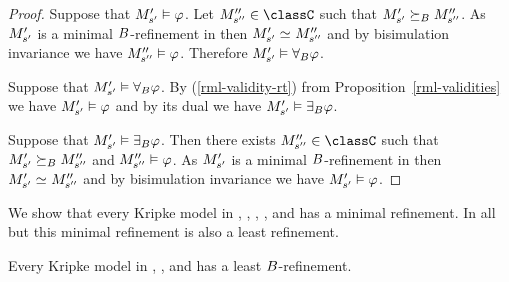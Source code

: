 \begin{proof}
Suppose that ${M^{\prime}_{{s}^{\prime}}} \vDash \varphi$.
Let $\kPModelPP{\kStateSPP} \in \classC$ such that ${M^{\prime}_{{s}^{\prime}}} \succeq_{B} {M^{\prime\prime}_{{s}^{\prime\prime}}}$.
As ${M^{\prime}_{{s}^{\prime}}}$ is a minimal $B$-refinement in \classC{} then $\kPModelP{\kStateSP} \bisimilar \kPModelPP{\kStateSPP}$ and by bisimulation invariance we have ${M^{\prime\prime}_{{s}^{\prime\prime}}} \vDash \varphi$.
Therefore ${M^{\prime}_{{s}^{\prime}}} \vDash {\forall_{B}} \varphi$.

Suppose that ${M^{\prime}_{{s}^{\prime}}} \vDash {\forall_{B}} \varphi$.
By (\ref{rml-validity-rt}) from Proposition~\ref{rml-validities} we have ${M^{\prime}_{{s}^{\prime}}} \vDash \varphi$ and by its dual we have ${M^{\prime}_{{s}^{\prime}}} \vDash {\exists_{B}} \varphi$.

Suppose that ${M^{\prime}_{{s}^{\prime}}} \vDash {\exists_{B}} \varphi$.
Then there exists $\kPModelPP{\kStateSPP} \in \classC$ such that ${M^{\prime}_{{s}^{\prime}}} \succeq_{B} {M^{\prime\prime}_{{s}^{\prime\prime}}}$ and ${M^{\prime\prime}_{{s}^{\prime\prime}}} \vDash \varphi$.
As ${M^{\prime}_{{s}^{\prime}}}$ is a minimal $B$-refinement in \classC{} then $\kPModelP{\kStateSP} \bisimilar \kPModelPP{\kStateSPP}$ and by bisimulation invariance we have ${M^{\prime}_{{s}^{\prime}}} \vDash \varphi$.
\end{proof}

We show that every Kripke model in \classK{}, \classKF{}, \classKFF{}, \classKD{}, and \classS{} has a minimal refinement.
In all but \classKD{} this minimal refinement is also a least refinement.

\pagebreak

\begin{proposition}\label{minimal-refinement-k-k4-k45}
Every Kripke model in \classK{}, \classKF{}, and \classKFF{} has a least $B$-refinement.
\end{proposition}

